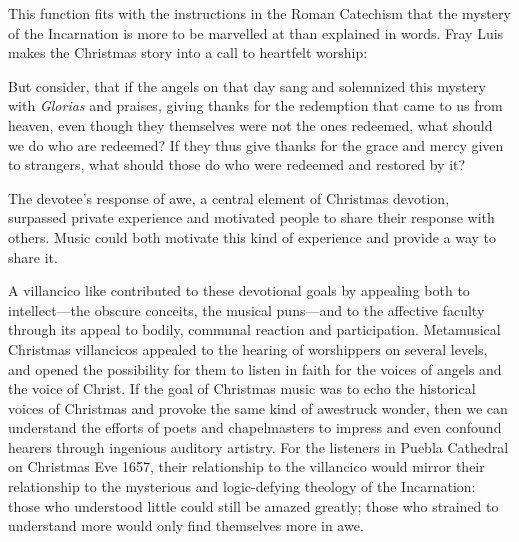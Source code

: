 This function fits with the instructions in the Roman Catechism that the mystery
of the Incarnation is more to be marvelled at than explained in words.
Fray Luis makes the Christmas story into a call to heartfelt worship:
\begin{quoting}
    But consider, that if the angels on that day sang and solemnized this
    mystery with \emph{Glorias} and praises, giving thanks for the redemption
    that came to us from heaven, even though they themselves were not the ones
    redeemed, what should we do who are redeemed?
    If they thus give thanks for the grace and mercy given to strangers, what
    should those do who were redeemed and restored by it?%
    \Autocite[41]{LuisdeGranada:Xmas}
\end{quoting}
The devotee's response of awe, a central element of Christmas devotion,
surpassed private experience and motivated people to share their response with
others.
Music could both motivate this kind of experience and provide a way
to share it.

A villancico like  contributed to these
devotional goals by appealing both to intellect---the obscure conceits, the
musical puns---and to the affective faculty through its appeal to bodily,
communal reaction and participation.
Metamusical Christmas villancicos appealed to the hearing of worshippers on
several levels, and opened the possibility for them to listen in faith for the
voices of angels and the voice of Christ.
If the goal of Christmas music was to echo the historical voices of Christmas
and provoke the same kind of awestruck wonder, then we can understand the
efforts of poets and chapelmasters to impress and even confound hearers through
ingenious auditory artistry.
For the listeners in Puebla Cathedral on Christmas Eve 1657, their relationship
to the villancico  would mirror their
relationship to the mysterious and logic-defying theology of the Incarnation:
those who understood little could still be amazed greatly; those who strained
to understand more would only find themselves more in awe.

\endinput
